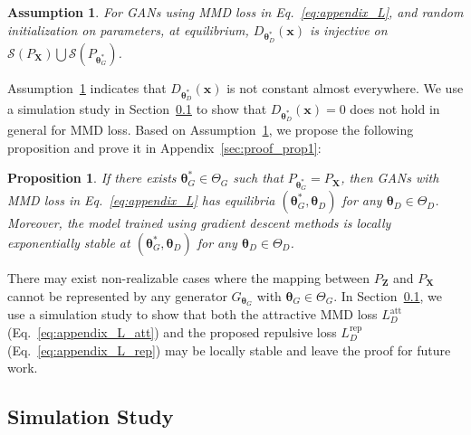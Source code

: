 \documentclass{article} %
\theoremstyle{plain}
\newtheorem{assumption}{Assumption}
\newtheorem{proposition}{Proposition}
\newtheorem*{proposition 1*}{Proposition 1}
\newcommand{\ds}[1]{\mathcal{#1}}  %
\newcommand{\rdv}[1]{\mathbf{#1}}  %
\begin{document}
\begin{appendices}
\begin{assumption}\label{Assum:nonzero}
	For GANs using MMD loss in Eq.~\ref{eq:appendix_L}, and random initialization on parameters, at equilibrium, \(D_{\bm{\theta}_D^*}(\bm{x})\) is injective on \(\ds{S}(P_{\rdv{X}})\bigcup\ds{S}(P_{\bm{\theta}_G^*})\).
\end{assumption}
Assumption~\ref{Assum:nonzero} indicates that \(D_{\bm{\theta}_D^*}(\bm{x})\) is not constant almost everywhere. We use a simulation study in Section~\ref{sec:exp:stability} to show that \(D_{\bm{\theta}_D^*}(\bm{x})=0\) does not hold in general for MMD loss. Based on Assumption~\ref{Assum:nonzero}, we propose the following proposition and prove it in Appendix~\ref{sec:proof_prop1}:
\begin{proposition}\label{Prop:equilibria_and_stable}
	If there exists \(\bm{\theta}_G^*\in\Theta_G\) such that \(P_{\bm{\theta}_G^*}=P_{\rdv{X}}\), then GANs with MMD loss in Eq.~\ref{eq:appendix_L} has equilibria \((\bm{\theta}_G^*, \bm{\theta}_D)\) for any \(\bm{\theta}_D\in\Theta_D\). Moreover, the model trained using gradient descent methods is locally exponentially stable at \((\bm{\theta}_G^*,\bm{\theta}_D)\) for any \(\bm{\theta}_D\in\Theta_D\).
\end{proposition}
There may exist non-realizable cases where the mapping between \(P_{\bm{Z}}\) and \(P_{\rdv{X}}\) cannot be represented by any generator \(G_{\bm{\theta}_G}\) with \(\bm{\theta}_G\in\Theta_G\). In Section~\ref{sec:exp:stability}, we use a simulation study to show that both the attractive MMD loss \(L_D^{\text{att}}\) (Eq.~\ref{eq:appendix_L_att}) and the proposed repulsive loss \(L_D^{\text{rep}}\) (Eq.~\ref{eq:appendix_L_rep}) may be locally stable and leave the proof for future work. 

\subsection{Simulation Study}
\label{sec:exp:stability}


\end{appendices}
\end{document}
